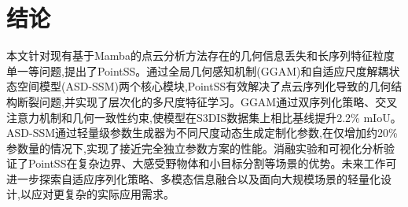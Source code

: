 \documentclass[preprint,12pt]{elsarticle}
\begin{document}
\section{结论}
本文针对现有基于Mamba的点云分析方法存在的几何信息丢失和长序列特征粒度单一等问题,提出了PointSS。通过全局几何感知机制(GGAM)和自适应尺度解耦状态空间模型(ASD-SSM)两个核心模块,PointSS有效解决了点云序列化导致的几何结构断裂问题,并实现了层次化的多尺度特征学习。GGAM通过双序列化策略、交叉注意力机制和几何一致性约束,使模型在S3DIS数据集上相比基线提升2.2\% mIoU。ASD-SSM通过轻量级参数生成器为不同尺度动态生成定制化参数,在仅增加约20\%参数量的情况下,实现了接近完全独立参数方案的性能。消融实验和可视化分析验证了PointSS在复杂边界、大感受野物体和小目标分割等场景的优势。未来工作可进一步探索自适应序列化策略、多模态信息融合以及面向大规模场景的轻量化设计,以应对更复杂的实际应用需求。









\end{document}
